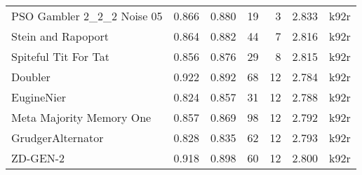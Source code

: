\begin{tabular}{lrrrrrl}
PSO Gambler 2\_2\_2 Noise 05  &                               0.866 &                            0.880 &            19 &     3 &  2.833 &   k92r \\
Stein and Rapoport          &                               0.864 &                            0.882 &            44 &     7 &  2.816 &   k92r \\
Spiteful Tit For Tat        &                               0.856 &                            0.876 &            29 &     8 &  2.815 &   k92r \\
Doubler                     &                               0.922 &                            0.892 &            68 &    12 &  2.784 &   k92r \\
EugineNier                  &                               0.824 &                            0.857 &            31 &    12 &  2.788 &   k92r \\
Meta Majority Memory One    &                               0.857 &                            0.869 &            98 &    12 &  2.792 &   k92r \\
GrudgerAlternator           &                               0.828 &                            0.835 &            62 &    12 &  2.793 &   k92r \\
ZD-GEN-2                    &                               0.918 &                            0.898 &            60 &    12 &  2.800 &   k92r \\
\bottomrule
\end{tabular}
